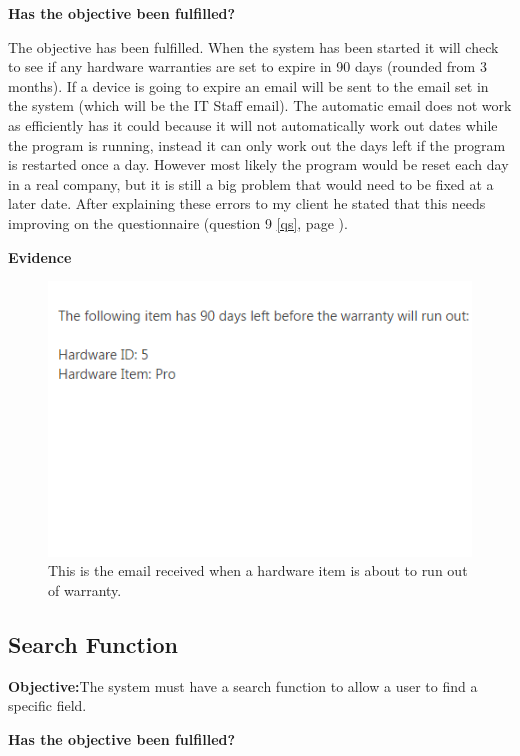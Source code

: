 \textbf{Has the objective been fulfilled?}

The objective has been fulfilled. When the system has been started it will check to see if any hardware warranties  are set to expire in 90 days (rounded from 3 months). If a device is going to expire an email will be sent to the email set in the system (which will be the IT Staff email). The automatic email does not work as efficiently has it could because it will not automatically work out dates while the program is running, instead it can only work out the days left if the program is restarted once a day. However most likely the program would be reset each day in a real company, but it is still a big problem that would need to be fixed at a later date. After explaining these errors to my client he stated that this needs improving on the questionnaire (question 9 \ref{qs}, page \pageref{qs}).

\textbf{Evidence}

\begin{figure}[H]
    \includegraphics[width=\textwidth]{./Testing/Images/EmailExpiredHardware.png}
    \caption{This is the email received when a hardware item is about to run out of warranty.} 
\end{figure}



\subsection{Search Function}

\textbf{Objective:}The system must have a search function to allow a user to find a specific field.

\textbf{Has the objective been fulfilled?}

